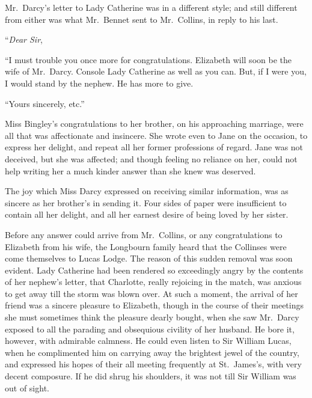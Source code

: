 Mr.\ Darcy's letter to Lady Catherine was in a different style;
and still different from either was what Mr.\ Bennet sent to
Mr.\ Collins, in reply to his last.

\bigskip
``\emph{Dear Sir},
\medskip

``I must trouble you once more for congratulations.  Elizabeth
will soon be the wife of Mr.\ Darcy.  Console Lady Catherine
as well as you can.  But, if I were you, I would stand by the
nephew.  He has more to give.

\medskip
``Yours sincerely, etc.''
\bigskip

Miss Bingley's congratulations to her brother, on his approaching
marriage, were all that was affectionate and insincere.  She
wrote even to Jane on the occasion, to express her delight, and
repeat all her former professions of regard. Jane was not
deceived, but she was affected; and though feeling no reliance
on her, could not help writing her a much kinder answer than
she knew was deserved.

The joy which Miss Darcy expressed on receiving similar
information, was as sincere as her brother's in sending it.
Four sides of paper were insufficient to contain all her
delight, and all her earnest desire of being loved by her
sister.

Before any answer could arrive from Mr.\ Collins, or any
congratulations to Elizabeth from his wife, the Longbourn
family heard that the Collinses were come themselves to Lucas
Lodge.  The reason of this sudden removal was soon evident.
Lady Catherine had been rendered so exceedingly angry by
the contents of her nephew's letter, that Charlotte, really
rejoicing in the match, was anxious to get away till the
storm was blown over.  At such a moment, the arrival of
her friend was a sincere pleasure to Elizabeth, though in
the course of their meetings she must sometimes think the
pleasure dearly bought, when she saw Mr.\ Darcy exposed to all
the parading and obsequious civility of her husband.  He bore
it, however, with admirable calmness.  He could even listen to
Sir William Lucas, when he complimented him on carrying away
the brightest jewel of the country, and expressed his hopes of
their all meeting frequently at St.\ James's, with very decent
composure.  If he did shrug his shoulders, it was not till Sir
William was out of sight.

